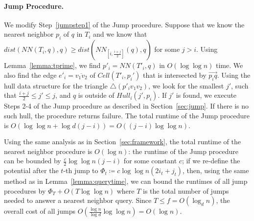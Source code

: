 \documentclass[12pt,a4paper,USenglish,cleveref, autoref, thm-restate]{article}
\newcommand{\ov}[1]{\overline{#1}}
\newcommand{\ovar}[1]{\overrightarrow{#1}}
\newcommand{\Cell}{\mathit{Cell}}
\newcommand{\Hull}{\mathit{Hull}}
\newcommand{\NN}{\mathit{NN}}
\newcommand{\ov}[1]{\overline{#1}}
\newcommand{\ovar}[1]{\overrightarrow{#1}}
\newcommand{\Cell}{\mathit{Cell}}
\newcommand{\Hull}{\mathit{Hull}}
\newcommand{\NN}{\mathit{NN}}
\newcommand{\ov}[1]{\overline{#1}}
\newcommand{\ovar}[1]{\overrightarrow{#1}}
\newcommand{\Cell}{\mathit{Cell}}
\newcommand{\Hull}{\mathit{Hull}}
\newcommand{\NN}{\mathit{NN}}
\begin{document}
\paragraph*{Jump Procedure.}
We modify Step~\ref{jumpstep1} of the Jump procedure. Suppose that we know the nearest neighbor $p_i$ of $q$ in $T_i$ and we know that %
$dist(\NN(T_i,q),q) \ge dist(\NN_{[i,\frac{i+j}{2}]}(q),q)$ for some $j>i$.
Using Lemma~\ref{lemma:tprime}, we find $p'_i=\NN(T'_i,q)$ in $O(\log\log n)$ time. We also find the edge $e'_i=\ov{v_1v_2}$ of $\Cell(T'_i, p_i')$ that  is intersected by $\ovar{p_iq}$.  Using the hull data structure for the triangle $\triangle(p'_iv_1v_2)$, we look for the smallest $j'$, such that $\frac{i+j}{2}\le j'\le j$,  and $q$ is outside of $\Hull_i(j',p_i)$. If $j'$ is found, we execute Steps 2-4 of the Jump procedure as described in Section~\ref{sec:jump}. If there is no such hull, the procedure returns failure.  The total runtime of the Jump procedure is $O(\log\log n + \log d(j-i))=O((j-i)\log \log n)$.

Using the same analysis as in Section~\ref{sec:framework}, the total runtime of the nearest neighbor procedure is $O(\log n)$: the runtime of the Jump procedure can be bounded by  $\frac{c}{2}\log\log n (j-i)$ for some constant $c$; if we re-define the potential after the $t$-th jump to $\Phi_t\coloneqq c\log\log n(2i_t+j_t)$, then, using the same method as in Lemma~\ref{lemma:querytime}, we can bound the runtimes of all jump procedures by $\Phi_T+O(T\log\log n)$ where $T$ is the total number of jumps needed to answer a nearest neighbor query. Since $T\le f=O(\log_d n)$, the overall cost of all jumps  $O(\frac{\log n}{\log d}\log\log n)=O(\log n)$. 
\end{document}

